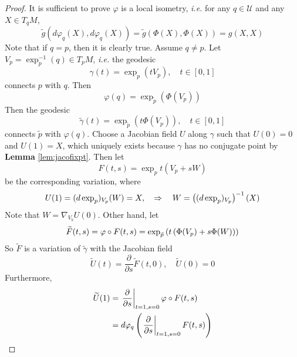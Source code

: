 \begin{enumerate}[label=\arabic{*}.]
\begin{proof}
		It is sufficient to prove $\varphi$ is a local isometry, \emph{i.e.} for any $q \in \mathcal{U}$ and any $X \in T_qM$,
		\begin{equation*}
			\widetilde{g}(d\varphi_q(X),d\varphi_q(X)) = \widetilde{g}(\Phi(X),\Phi(X)) = g(X,X)
		\end{equation*}
		Note that if $q = p$, then it is clearly true. Assume $q \neq p$. Let $V_p = \exp_p^{-1}(q) \in T_pM$, \emph{i.e.} the geodesic
		\begin{equation*}
			\gamma(t) = \exp_p(tV_p),\quad t \in [0,1]
		\end{equation*}
		connects $p$ with $q$. Then
		\begin{equation*}
		 	\varphi(q) =  {\exp}_{\tilde{p}}(\Phi(V_p))
		\end{equation*}
		Then the geodesic
		\begin{equation*}
			 \widetilde{\gamma}(t) =  {\exp}_{\tilde{p}}(t\Phi(V_p)),\quad t \in [0,1]
		\end{equation*}
		connects $\tilde{p}$ with $\varphi(q)$. Choose a Jacobian field $U$ along $\gamma$ such that $U(0) = 0$ and $U(1) = X$, which uniquely exists because $\gamma$ has no conjugate point by \textbf{Lemma} \ref{lem:jacofixpt}. Then let
		\begin{equation*}
			F(t,s) = \exp_p t(V_p + sW)
		\end{equation*}
		be the corresponding variation, where
		\begin{equation*}
			U(1) = (d\exp_p)_{V_p}(W) = X,\quad \Rightarrow \quad W = \left((d\exp_p)_{V_p}\right)^{-1}(X)
		\end{equation*}
		Note that $W = \nabla_{V_b}U(0)$. Other hand, let
		\begin{equation*}
			\widetilde{F}(t,s) = \varphi\circ F(t,s) = {\exp}_{\tilde{p}}\left(t\left(\Phi(V_p)+s\Phi(W)\right)\right)
		\end{equation*}
		So $\widetilde{F}$ is a variation of $\widetilde{\gamma}$ with the Jacobian field
		\begin{equation*}
			\widetilde{U}(t) = \frac{\partial}{\partial s}\widetilde{F}(t,0),\quad \widetilde{U}(0) = 0
		\end{equation*}
		Furthermore,
		\begin{equation*}
			\begin{aligned}
				\widetilde{U}(1) &= \lv{\frac{\partial}{\partial s}}_{t=1,s=0} \varphi \circ F(t,s) \\
				&= d\varphi_q\bc{\lv{\frac{\partial}{\partial s}}_{t=1,s=0}F(t,s)} \\

\end{aligned}
\end{equation*}
\end{proof}
\end{enumerate}

